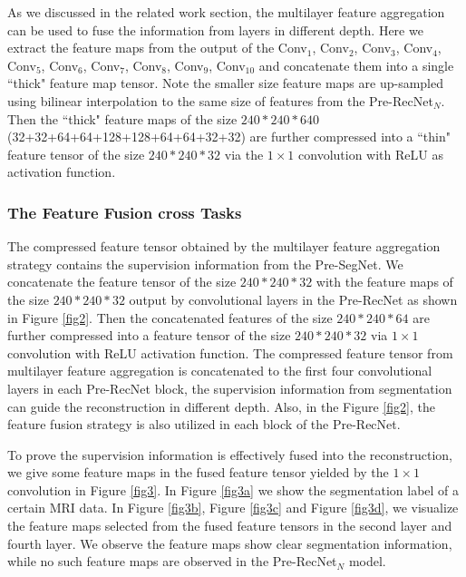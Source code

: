 \documentclass[runningheads]{llncs}
\begin{document}
As we discussed in the related work section, the multilayer feature aggregation can be used to fuse the information from layers in different depth. Here we extract the feature maps from the output of the Conv$_1$, Conv$_2$, Conv$_3$, Conv$_4$, Conv$_5$, Conv$_6$, Conv$_7$, Conv$_8$, Conv$_9$, Conv$_{10}$ and concatenate them into a single ``thick" feature map tensor. Note the smaller size feature maps are up-sampled using bilinear interpolation to the same size of features from the Pre-RecNet$_N$. Then the ``thick" feature maps of the size $240*240*640$ (32+32+64+64+128+128+64+64+32+32) are further compressed into a ``thin" feature tensor of the size $240*240*32$ via the $1\times1$ convolution with ReLU as activation function.

\subsubsection{The Feature Fusion cross Tasks}
\label{TFFinRec}

The compressed feature tensor obtained by the multilayer feature aggregation strategy contains the supervision information from the Pre-SegNet. We concatenate the feature tensor of the size $240*240*32$ with the feature maps of the size $240*240*32$ output by convolutional layers in the Pre-RecNet as shown in Figure \ref{fig2}. Then the concatenated features of the size $240*240*64$ are further compressed into a feature tensor of the size $240*240*32$ via $1\times1$ convolution with ReLU activation function. The compressed feature tensor from multilayer feature aggregation is concatenated to the first four convolutional layers in each Pre-RecNet block, the supervision information from segmentation can guide the reconstruction in different depth. Also, in the Figure \ref{fig2}, the feature fusion strategy is also utilized in each block of the Pre-RecNet.

To prove the supervision information is effectively fused into the reconstruction, we give some feature maps in the fused feature tensor yielded by the $1\times1$ convolution in Figure \ref{fig3}. In Figure \ref{fig3a} we show the segmentation label of a certain MRI data. In Figure \ref{fig3b}, Figure \ref{fig3c} and Figure \ref{fig3d}, we visualize the feature maps selected from the fused feature tensors in the second layer and fourth layer. We observe the feature maps show clear segmentation information, while no such feature maps are observed in the Pre-RecNet$_N$ model.
\end{document}
